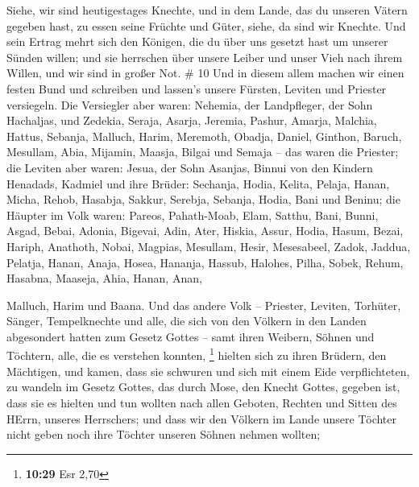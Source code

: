  Siehe, wir sind heutigestages Knechte, und in dem Lande,
das du unseren Vätern gegeben hast, zu essen seine Früchte und Güter,
siehe, da sind wir Knechte.  Und sein Ertrag mehrt sich den
Königen, die du über uns gesetzt hast um unserer Sünden willen; und sie
herrschen über unsere Leiber und unser Vieh nach ihrem Willen, und wir
sind in großer Not. \# 10  Und in diesem allem machen wir
einen festen Bund und schreiben und lassen's unsere Fürsten, Leviten und
Priester versiegeln.  Die Versiegler aber waren: Nehemia,
der Landpfleger, der Sohn Hachaljas, und Zedekia,  Seraja,
Asarja, Jeremia,  Pashur, Amarja, Malchia, 
Hattus, Sebanja, Malluch,  Harim, Meremoth, Obadja,
 Daniel, Ginthon, Baruch,  Mesullam, Abia,
Mijamin,  Maasja, Bilgai und Semaja -- das waren die
Priester;  die Leviten aber waren: Jesua, der Sohn Asanjas,
Binnui von den Kindern Henadads, Kadmiel  und ihre Brüder:
Sechanja, Hodia, Kelita, Pelaja, Hanan,  Micha, Rehob,
Hasabja,  Sakkur, Serebja, Sebanja,  Hodia,
Bani und Beninu;  die Häupter im Volk waren: Pareos,
Pahath-Moab, Elam, Satthu, Bani,  Bunni, Asgad, Bebai,
 Adonia, Bigevai, Adin,  Ater, Hiskia, Assur,
 Hodia, Hasum, Bezai,  Hariph, Anathoth,
Nobai,  Magpias, Mesullam, Hesir,  Mesesabeel,
Zadok, Jaddua,  Pelatja, Hanan, Anaja,  Hosea,
Hananja, Hassub,  Halohes, Pilha, Sobek, 
Rehum, Hasabna, Maaseja,  Ahia, Hanan, Anan,

 Malluch, Harim und Baana.  Und das andere
Volk -- Priester, Leviten, Torhüter, Sänger, Tempelknechte und alle, die
sich von den Völkern in den Landen abgesondert hatten zum Gesetz Gottes
-- samt ihren Weibern, Söhnen und Töchtern, alle, die es verstehen
konnten, \footnote{\textbf{10:29} Esr 2,70}  hielten sich
zu ihren Brüdern, den Mächtigen, und kamen, dass sie schwuren und sich
mit einem Eide verpflichteten, zu wandeln im Gesetz Gottes, das durch
Mose, den Knecht Gottes, gegeben ist, dass sie es hielten und tun
wollten nach allen Geboten, Rechten und Sitten des HErrn, unseres
Herrschers;  und dass wir den Völkern im Lande unsere
Töchter nicht geben noch ihre Töchter unseren Söhnen nehmen wollten;

